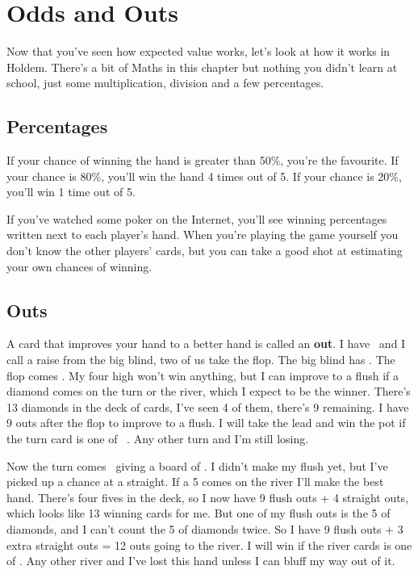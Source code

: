 \chapter{Odds and Outs}


Now that you've seen how expected value works, let's look at how it
works in Holdem. There's a bit of Maths in this chapter but nothing you
didn't learn at school, just some multiplication, division and a
few percentages.

\section{Percentages}

If your chance of winning the hand is greater than 50\%, you're the
favourite. If your chance is 80\%, you'll win the hand 4 times out of
5. If your chance is 20\%, you'll win 1 time out of 5.

If you've watched some poker on the Internet, you'll see winning
percentages written next to each player's hand. When you're playing
the game yourself you don't know the other players' cards, but you can
take a good shot at estimating your own chances of winning.

\section{Outs}

A card that improves your hand to a better hand is called an \textbf{out}. I
have \fourd\tred\ and I call a raise from the big blind, two of us
take the flop. The big blind has \As\Js. The flop comes
\Ad\tens\eigd. My four high won't win anything, but I can improve to a
flush if a diamond comes on the turn or the river, which I expect to
be the winner. There's 13 diamonds in the deck of cards, I've seen 4
of them, there's 9 remaining. I have 9 outs after the flop to improve
to a flush. I will take the lead and win the pot if the turn card is
one of \Kd\Qd\Jd\tend\nined\sevd\sixd\fived\twod\ . Any other turn
and I'm still losing.

Now the turn comes \twoc\, giving a board of \Ad\tens\eigd\twoc. I
didn't make my flush yet, but I've picked up a chance at a
straight. If a 5 comes on the river I'll make the best hand. There's
four fives in the deck, so I now have 9 flush outs + 4 straight outs,
which looks like 13 winning cards for me. But one of my flush outs is
the 5 of diamonds, and I can't count the 5 of diamonds twice. So I
have 9 flush outs + 3 extra straight outs = 12 outs going to the
river. I will win if the river cards is one of
\Kd\Qd\Jd\tend\nined\sevd\sixd\fived\twod\fives\fivec\fiveh . Any
other river and I've lost this hand unless I can bluff my way out of
it.

